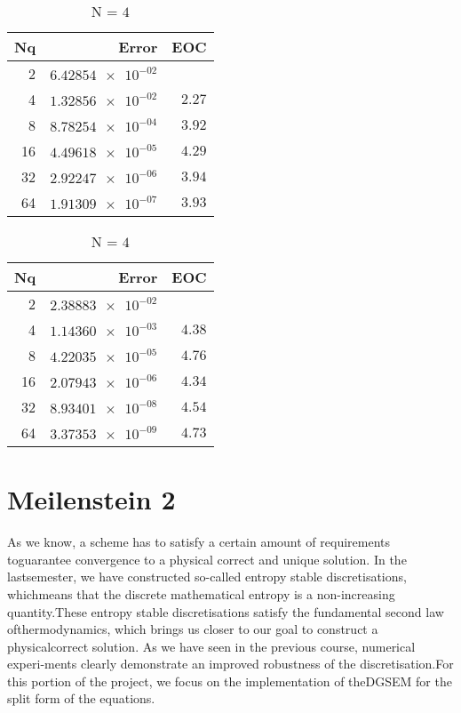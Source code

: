 \documentclass[11pt]{scrartcl}
\begin{document}
\begin{table}[H]
\parbox{.45\linewidth}{
\centering
    \begin{tabular}{|r|r|r|}
    \hline\hline
    \textbf{Nq} & \textbf{Error} & \textbf{EOC} \\\hline
    2 & $\num{6.42854e-02}$ &  \\
    4 & $\num{1.32856e-02}$ & $\num{2.27}$ \\
    8 & $\num{8.78254e-04}$ & $\num{3.92}$ \\
    16 & $\num{4.49618e-05}$ & $\num{4.29}$ \\
    32 & $\num{2.92247e-06}$ & $\num{3.94}$ \\
    64 & $\num{1.91309e-07}$ & $\num{3.93}$ \\\hline\hline
  \end{tabular} 
  \caption{N = $3$}
  }
  \parbox{.45\linewidth}{
	\centering
    \begin{tabular}{|r|r|r|}
    \hline\hline
    \textbf{Nq} & \textbf{Error} & \textbf{EOC} \\\hline
    2 & $\num{2.38883e-02}$ &  \\
    4 & $\num{1.14360e-03}$ & $\num{4.38}$ \\
    8 & $\num{4.22035e-05}$ & $\num{4.76}$ \\
    16 & $\num{2.07943e-06}$ & $\num{4.34}$ \\
    32 & $\num{8.93401e-08}$ & $\num{4.54}$ \\
    64 & $\num{3.37353e-09}$ & $\num{4.73}$ \\\hline\hline
  \end{tabular}
   \caption{N = $4$}
  }
\end{table}

\newpage
\section{Meilenstein 2}
As we know, a scheme has to satisfy a certain amount of requirements toguarantee convergence to a physical correct and unique solution. In the lastsemester, we have constructed so-called entropy stable discretisations, whichmeans that the discrete mathematical entropy is a non-increasing quantity.These entropy stable discretisations satisfy the fundamental second law ofthermodynamics, which brings us closer to our goal to construct a physicalcorrect solution. As we have seen in the previous course, numerical experi-ments clearly demonstrate an improved robustness of the discretisation.For this portion of the project, we focus on the implementation of theDGSEM for the split form of the equations.
\end{document}

